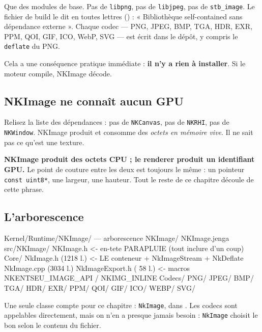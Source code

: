 Que des modules de base. Pas de \texttt{libpng}, pas de \texttt{libjpeg}, pas de
\texttt{stb\_image}. Le fichier de build le dit en toutes lettres
() : « Bibliothèque self-contained sans dépendance
externe ». Chaque codec — PNG, JPEG, BMP, TGA, HDR, EXR, PPM, QOI, GIF, ICO,
WebP, SVG — est écrit dans le dépôt, y compris le \texttt{deflate} du PNG.

Cela a une conséquence pratique immédiate : \textbf{il n'y a rien à installer}.
Si le moteur compile, NKImage décode.

\subsection{NKImage ne connaît aucun GPU}

Relisez la liste des dépendances : pas de \texttt{NKCanvas}, pas de
\texttt{NKRHI}, pas de \texttt{NKWindow}. NKImage produit et consomme des
\emph{octets en mémoire vive}. Il ne sait pas ce qu'est une texture.

\begin{nkretenir}
\textbf{NKImage produit des octets CPU ; le renderer produit un identifiant
GPU.} Le point de couture entre les deux est toujours le même : un pointeur
\texttt{const uint8*}, une largeur, une hauteur. Tout le reste de ce chapitre
découle de cette phrase.
\end{nkretenir}

\subsection{L'arborescence}

\begin{nkcode}{Kernel/Runtime/NKImage/ — arborescence}
NKImage/
  NKImage.jenga
  src/NKImage/
    NKImage.h                         <- en-tete PARAPLUIE (tout inclure d'un coup)
    Core/
      NkImage.h        (1218 l.)      <- LE conteneur + NkImageStream + NkDeflate
      NkImage.cpp      (3034 l.)
      NkImageExport.h  (  58 l.)      <- macros NKENTSEU_IMAGE_API / NKIMG_INLINE
    Codecs/
      PNG/  JPEG/  BMP/  TGA/  HDR/  EXR/
      PPM/  QOI/   GIF/  ICO/  WEBP/  SVG/
\end{nkcode}

Une seule classe compte pour ce chapitre : \texttt{NkImage}, dans
. Les codecs sont
appelables directement, mais on n'en a presque jamais besoin : \texttt{NkImage}
choisit le bon selon le contenu du fichier.

